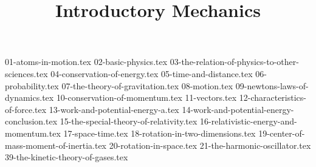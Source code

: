 

\usepackage{import}

\newcommand\bookmode{}


  \title{Introductory Mechanics}
  \maketitle

  {01-atoms-in-motion.tex}
  \clearpage
  {02-basic-physics.tex}
  \clearpage
  {03-the-relation-of-physics-to-other-sciences.tex}
  \clearpage
  {04-conservation-of-energy.tex}
  \clearpage
  {05-time-and-distance.tex}
  \clearpage
  {06-probability.tex}
  \clearpage
  {07-the-theory-of-gravitation.tex}
  \clearpage
  {08-motion.tex}
  \clearpage
  {09-newtons-laws-of-dynamics.tex}
  \clearpage
  {10-conservation-of-momentum.tex}
  \clearpage
  {11-vectors.tex}
  \clearpage
  {12-characteristics-of-force.tex}
  \clearpage
  {13-work-and-potential-energy-a.tex}
  \clearpage
  {14-work-and-potential-energy-conclusion.tex}
  \clearpage
  {15-the-special-theory-of-relativity.tex}
  \clearpage
  {16-relativistic-energy-and-momentum.tex}
  \clearpage
  {17-space-time.tex}
  \clearpage
  {18-rotation-in-two-dimensions.tex}
  \clearpage
  {19-center-of-mass-moment-of-inertia.tex}
  \clearpage
  {20-rotation-in-space.tex}
  \clearpage
  {21-the-harmonic-oscillator.tex}
  \clearpage
  {39-the-kinetic-theory-of-gases.tex}

